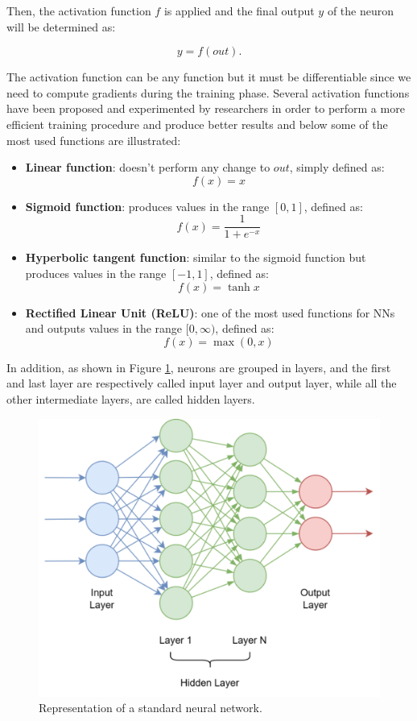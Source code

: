 \documentclass[binding=0.6cm,noexaminfo]{sapthesis}
\begin{document}
Then, the activation function $f$ is applied and the final output $y$ of the neuron will be determined as:

\begin{equation}
y = f(out).
\end{equation}

The activation function can be any function but it must be differentiable since we need to compute gradients during the training phase. Several activation functions have been proposed and experimented by researchers in order to perform a more efficient training procedure and produce better results and below some of the most used functions are illustrated:
\begin{itemize}
\item \textbf{Linear function}: doesn't perform any change to $out$, simply defined as:
\begin{equation}
f(x) = x
\end{equation}
\item \textbf{Sigmoid function}: produces values in the range $[0, 1]$, defined as:
\begin{equation}
f(x) = \frac{1}{1 + e^{-x}}
\end{equation}
\item \textbf{Hyperbolic tangent function}: similar to the sigmoid function but produces values in the range $[-1, 1]$, defined as:
\begin{equation}
f(x) = \tanh x
\end{equation}
\item \textbf{Rectified Linear Unit (ReLU)}: one of the most used functions for NNs and outputs values in the range $[0, \infty)$, defined as:
\begin{equation}
f(x) = \max (0, x)
\end{equation}
\end{itemize}

In addition, as shown in Figure \ref{fig:dnn}, neurons are grouped in layers, and the first and last layer are respectively called input layer and output layer, while all the other intermediate layers, are called hidden layers.

\begin{figure}[h!]
\centering
\includegraphics[width=.8\linewidth]{dnn}
\caption{Representation of a standard neural network.}
\label{fig:dnn}
\end{figure}
\end{document}
